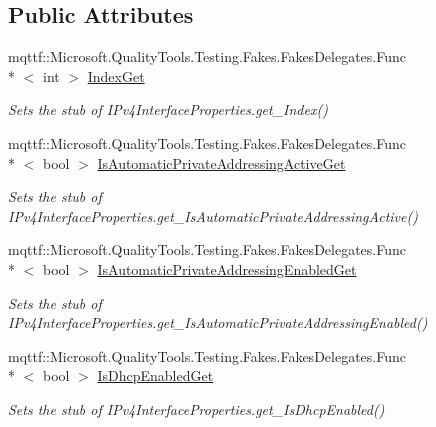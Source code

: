 \subsection*{Public Attributes}
\begin{DoxyCompactItemize}
\item 
mqttf\-::\-Microsoft.\-Quality\-Tools.\-Testing.\-Fakes.\-Fakes\-Delegates.\-Func\\*
$<$ int $>$ \hyperlink{class_system_1_1_net_1_1_network_information_1_1_fakes_1_1_stub_i_pv4_interface_properties_a301db552d6247861cd0170c8fc6e722e}{Index\-Get}
\begin{DoxyCompactList}\small\item\em Sets the stub of I\-Pv4\-Interface\-Properties.\-get\-\_\-\-Index()\end{DoxyCompactList}\item 
mqttf\-::\-Microsoft.\-Quality\-Tools.\-Testing.\-Fakes.\-Fakes\-Delegates.\-Func\\*
$<$ bool $>$ \hyperlink{class_system_1_1_net_1_1_network_information_1_1_fakes_1_1_stub_i_pv4_interface_properties_aa0b71148e9de01fd43851132300be9f7}{Is\-Automatic\-Private\-Addressing\-Active\-Get}
\begin{DoxyCompactList}\small\item\em Sets the stub of I\-Pv4\-Interface\-Properties.\-get\-\_\-\-Is\-Automatic\-Private\-Addressing\-Active()\end{DoxyCompactList}\item 
mqttf\-::\-Microsoft.\-Quality\-Tools.\-Testing.\-Fakes.\-Fakes\-Delegates.\-Func\\*
$<$ bool $>$ \hyperlink{class_system_1_1_net_1_1_network_information_1_1_fakes_1_1_stub_i_pv4_interface_properties_aef1e2ac5aa63fed871be6e3e62ebb28b}{Is\-Automatic\-Private\-Addressing\-Enabled\-Get}
\begin{DoxyCompactList}\small\item\em Sets the stub of I\-Pv4\-Interface\-Properties.\-get\-\_\-\-Is\-Automatic\-Private\-Addressing\-Enabled()\end{DoxyCompactList}\item 
mqttf\-::\-Microsoft.\-Quality\-Tools.\-Testing.\-Fakes.\-Fakes\-Delegates.\-Func\\*
$<$ bool $>$ \hyperlink{class_system_1_1_net_1_1_network_information_1_1_fakes_1_1_stub_i_pv4_interface_properties_a334a286409d2b777ed38a0444e7c01d8}{Is\-Dhcp\-Enabled\-Get}
\begin{DoxyCompactList}\small\item\em Sets the stub of I\-Pv4\-Interface\-Properties.\-get\-\_\-\-Is\-Dhcp\-Enabled()\end{DoxyCompactList}\item 

\end{DoxyCompactItemize}
